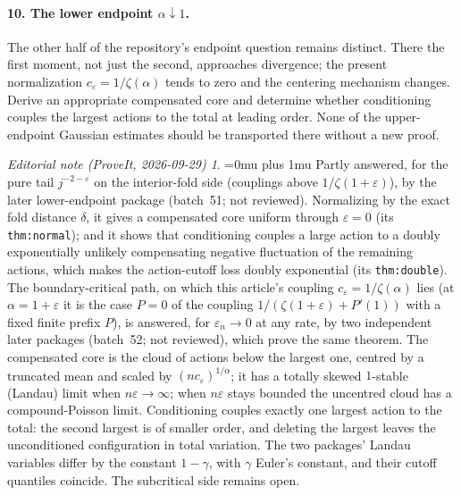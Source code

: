 \documentclass[11pt,a4paper]{article}
\numberwithin{equation}{section}
\theoremstyle{definition}
\theoremstyle{remark}
\newtheorem*{ednoteinner}{Editorial note (ProveIt, 2026-09-29)}
\newenvironment{ednote}{\begin{ednoteinner}\sloppy\Urlmuskip=0mu plus 1mu\relax}{\end{ednoteinner}}
\newcommand{\eps}{\varepsilon}
\begin{document}
\paragraph{10. The lower endpoint \(\alpha\downarrow1\).}
The other half of the repository's endpoint question remains distinct. There
the first moment, not just the second, approaches divergence; the present
normalization \(c_\eps=1/\zeta(\alpha)\) tends to zero and the centering
mechanism changes. Derive an appropriate compensated core and determine
whether conditioning couples the largest actions to the total at leading
order. None of the upper-endpoint Gaussian estimates should be transported
there without a new proof.
\begin{ednote}
Partly answered, for the pure tail \(j^{-2-\eps}\) on the interior-fold side
(couplings above \(1/\zeta(1+\eps)\)), by the later lower-endpoint package
\cite{ed:lcl} (batch~51; not reviewed). Normalizing by the exact fold
distance \(\delta\), it gives a compensated core uniform through \(\eps=0\)
(its \texttt{thm:normal}); and it shows that conditioning couples a large
action to a doubly exponentially unlikely compensating negative fluctuation
of the remaining actions, which makes the action-cutoff loss doubly
exponential (its \texttt{thm:double}). The boundary-critical path, on which
this article's coupling \(c_\eps=1/\zeta(\alpha)\) lies (at
\(\alpha=1+\eps\) it is the case \(P=0\) of the coupling
\(1/(\zeta(1+\eps)+P'(1))\) with a fixed finite prefix \(P\)), is answered,
for \(\eps_n\to0\) at any rate, by two independent later packages
\cite{ed:lcc,ed:lcu} (batch~52; not reviewed), which prove the same theorem.
The compensated core is the cloud of actions below the largest one, centred
by a truncated mean and scaled by \((nc_\eps)^{1/\alpha}\); it has a totally
skewed \(1\)-stable (Landau) limit when \(n\eps\to\infty\); when \(n\eps\)
stays bounded the uncentred cloud has a compound-Poisson limit. Conditioning
couples
exactly one largest action to the total: the second largest is of smaller
order, and deleting the largest leaves the unconditioned configuration in
total variation. The two packages' Landau variables differ by the constant
\(1-\gamma\), with \(\gamma\) Euler's constant, and their cutoff quantiles
coincide. The subcritical side remains open.
\end{ednote}
\end{document}
